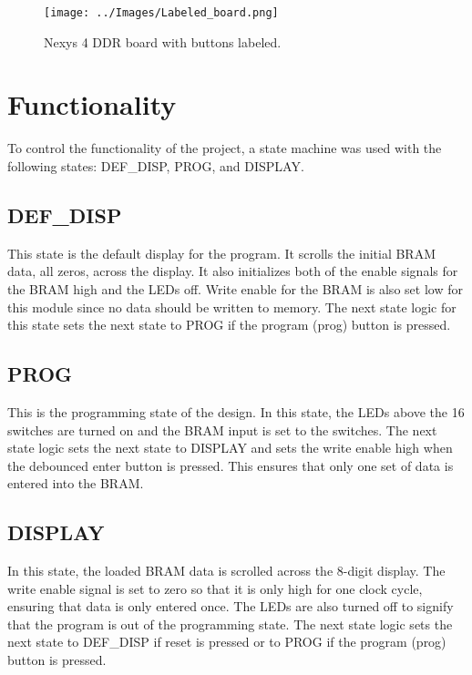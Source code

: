 \documentclass{article}
\begin{document}
\begin{figure}[h!]
	\begin{center}
		\caption{Nexys 4 DDR board with buttons labeled.}\label{fig:labeled_board}
		\texttt{[image: ../Images/Labeled\_board.png]}
	\end{center}
\end{figure}

\section{Functionality}
To control the functionality of the project, a state machine was used with the following states: DEF\_DISP, PROG, and DISPLAY.

\subsection{DEF\_DISP}
This state is the default display for the program. It scrolls the initial BRAM data, all zeros, across the display. It also initializes both of the enable signals for the BRAM high and the LEDs off. Write enable for the BRAM is also set low for this module since no data should be written to memory. 
The next state logic for this state sets the next state to PROG if the program (prog) button is pressed.

\subsection{PROG}
This is the programming state of the design. In this state, the LEDs above the 16 switches are turned on and the BRAM input is set to the switches.
The next state logic sets the next state to DISPLAY and sets the write enable high when the debounced enter button is pressed. This ensures that only one set of data is entered into the BRAM.

\subsection{DISPLAY}
In this state, the loaded BRAM data is scrolled across the 8-digit display. The write enable signal is set to zero so that it is only high for one clock cycle, ensuring that data is only entered once. The LEDs are also turned off to signify that the program is out of the programming state. 
The next state logic sets the next state to DEF\_DISP if reset is pressed or to PROG if the program (prog) button is pressed.
\end{document}
